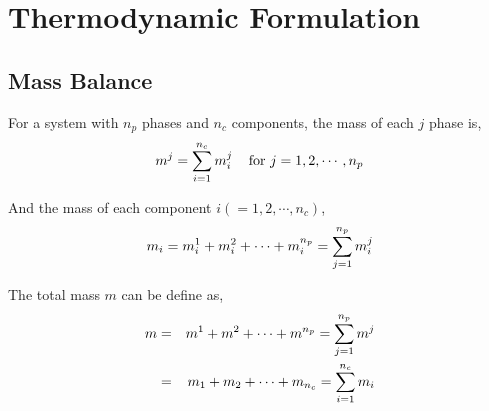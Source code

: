 
\chapter{Thermodynamic Formulation}

 
\section{Mass Balance}
For a system with $n_{p}$ phases and $n_{c}$ components, the mass of each $j$ phase is,
\begin{equation}
m^{j} = \sum\limits_{i=1}^{n_{c}}m_{i}^{j}\;\;\;\text{ for }j=1,2,\cdots,n_{p}
\label{Eqn_MassBalance_Phase}
\end{equation}

And the mass of each component $i\left(=1,2,\cdots,n_{c}\right)$,
\begin{equation}
m_{i} = m_{i}^{1} + m_{i}^{2} + \cdots + m_{i}^{n_{p}} = \sum\limits_{j=1}^{n_{p}}m_{i}^{j}
\label{Eqn_MassBalance_Component}
\end{equation}

The total mass $m$ can be define as,
\begin{eqnarray}
m & = & m^{1} + m^{2} + \cdots + m^{n_{p}} = \sum\limits_{j=1}^{n_{p}}m^{j} \nonumber \\
  & = & m_{1} + m_{2} + \cdots + m_{n_{c}} = \sum\limits_{i=1}^{n_{c}}m_{i} \nonumber 
\label{Eqn_MassBalance_Mass}
\end{eqnarray}

